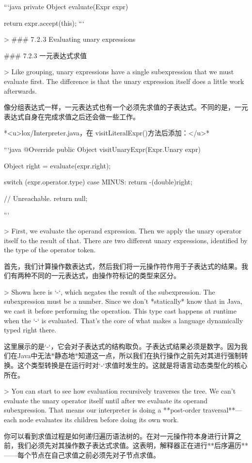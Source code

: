 \documentclass[cn,11pt,chinese]{elegantbook}
\begin{document}
```java
  private Object evaluate(Expr expr) {
    return expr.accept(this);
```

> ### 7 . 2 . 3 Evaluating unary expressions

### 7.2.3 一元表达式求值

> Like grouping, unary expressions have a single subexpression that we must evaluate first. The difference is that the unary expression itself does a little work afterwards.

像分组表达式一样，一元表达式也有一个必须先求值的子表达式。不同的是，一元表达式自身在完成求值之后还会做一些工作。

*<u>lox/Interpreter.java，在 visitLiteralExpr()方法后添加：</u>*

```java
  @Override
  public Object visitUnaryExpr(Expr.Unary expr) {
    Object right = evaluate(expr.right);

    switch (expr.operator.type) {
      case MINUS:
        return -(double)right;
    }

    // Unreachable.
    return null;
  }
```

> First, we evaluate the operand expression. Then we apply the unary operator itself to the result of that. There are two different unary expressions, identified by the type of the operator token.

首先，我们计算操作数表达式，然后我们将一元操作符作用于子表达式的结果。我们有两种不同的一元表达式，由操作符标记的类型来区分。

> Shown here is `-`, which negates the result of the subexpression. The subexpression must be a number. Since we don’t *statically* know that in Java, we cast it before performing the operation. This type cast happens at runtime when the `-` is evaluated. That’s the core of what makes a language dynamically typed right there.

这里展示的是`-`，它会对子表达式的结构取负。子表达式结果必须是数字。因为我们在Java中无法*静态地*知道这一点，所以我们在执行操作之前先对其进行强制转换。这个类型转换是在运行时对`-`求值时发生的。这就是将语言动态类型化的核心所在。

> You can start to see how evaluation recursively traverses the tree. We can’t evaluate the unary operator itself until after we evaluate its operand subexpression. That means our interpreter is doing a **post-order traversal**—each node evaluates its children before doing its own work.

你可以看到求值过程是如何递归遍历语法树的。在对一元操作符本身进行计算之前，我们必须先对其操作数子表达式求值。这表明，解释器正在进行**后序遍历**——每个节点在自己求值之前必须先对子节点求值。

}
\end{document}
